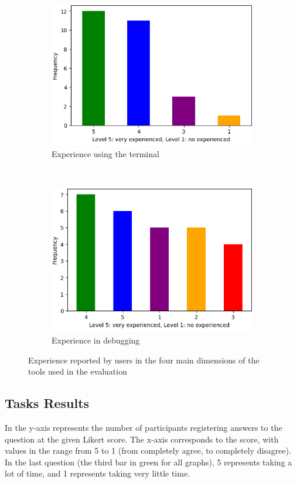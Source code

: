 \begin{figure}[hptb]
\begin{subfigure}[b]{0.45\textwidth}
        \includegraphics[width=\textwidth]{figures/experience-terminal}
        \caption{Experience using the terminal}
        \label{fig:terminal-experience}
    \end{subfigure}
    ~ 
    \begin{subfigure}[b]{0.45\textwidth}
        \centering
        \includegraphics[width=\textwidth]{figures/experience-debuggers}
        \caption{Experience in debugging}
        \label{fig:debugging-experience}
    \end{subfigure}
    \caption{Experience reported by users in the four main dimensions of the tools used in the evaluation}
    \label{fig:general-know}
\end{figure}


\subsection{Tasks Results}
\label{sec:tasks-results}
In  the y-axis represents the number of participants registering 
answers to the question at the given Likert score. The x-axis corresponds to the score, with
values in the range from 5 to 1 (from completely agree, to completely disagree). In the last 
question (the third bar in green for all graphs), 5 represents taking a lot of time, and 1 represents 
taking very little time.

